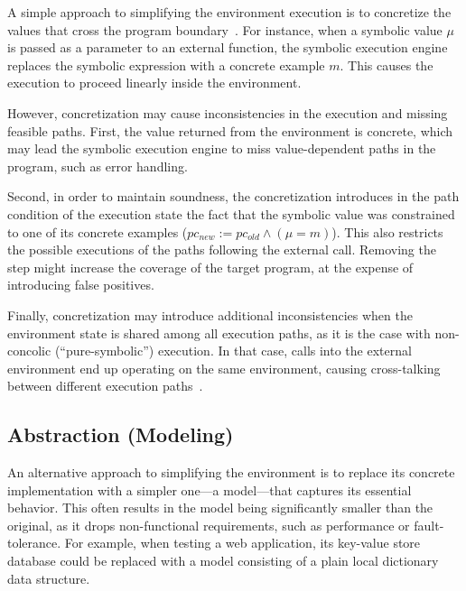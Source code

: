 A simple approach to simplifying the environment execution is to concretize the values that cross the program boundary~\cite{dart,godefroid:fuzz,klee}.
%
For instance, when a symbolic value $\mu$ is passed as a parameter to an external function, the symbolic execution engine replaces the symbolic expression with a concrete example $m$.  This causes the execution to proceed linearly inside the environment.

However, concretization may cause inconsistencies in the execution and missing feasible paths.
%
First, the value returned from the environment is concrete, which may lead the symbolic execution engine to miss value-dependent paths in the program, such as error handling.

Second, in order to maintain soundness, the concretization introduces in the path condition of the execution state the fact that the symbolic value was constrained to one of its concrete examples ($pc_{new} := pc_{old} \wedge (\mu = m)$).  This also restricts the possible executions of the paths following the external call.  Removing the step might increase the coverage of the target program, at the expense of introducing false positives.

Finally, concretization may introduce additional inconsistencies when the environment state is shared among all execution paths, as it is the case with non-concolic (``pure-symbolic'') execution.  In that case, calls into the external environment end up operating on the same environment, causing cross-talking between different execution paths~\cite{klee}.

\subsection{Abstraction (Modeling)}


An alternative approach to simplifying the environment is to replace its concrete implementation with a simpler one---a model---that captures its essential behavior.
%
This often results in the model being significantly smaller than the original, as it drops non-functional requirements, such as performance or fault-tolerance.  For example, when testing a web application, its key-value store database could be replaced with a model consisting of a plain local dictionary data structure.

